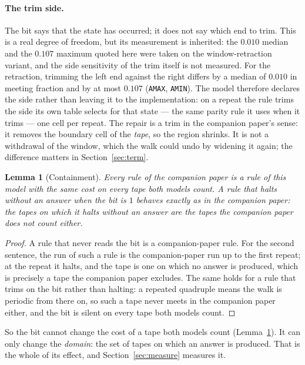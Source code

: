 \documentclass[11pt]{article}
\newtheorem{lemma}[theorem]{Lemma}
\theoremstyle{remark}
\begin{document}
\paragraph{The trim side.} The bit says that the state has occurred; it does not say which end to trim. This
is a real degree of freedom, but its measurement is inherited: the $0.010$ median and the $0.107$ maximum quoted here were taken on the window-retraction variant, and the side sensitivity of the trim itself is not measured. For the retraction, trimming the left end against the right differs by a median of $0.010$ in
meeting fraction and by at most $0.107$ (\texttt{AMAX}, \texttt{AMIN}). The model therefore declares the side rather
than leaving it to the implementation: on a repeat the rule trims the side its own table selects for that
state --- the same parity rule it uses when it trims --- one cell per repeat. The repair is a trim in the
companion paper's sense: it removes the boundary cell of the \emph{tape}, so the region shrinks. It is not a
withdrawal of the window, which the walk could undo by widening it again; the difference matters in
Section~\ref{sec:term}.

\begin{lemma}[Containment]\label{lem:contain}
Every rule of the companion paper is a rule of this model with the same cost on every tape both models
count. A rule that
halts without an answer when the bit is $1$ behaves exactly as in the companion paper: the tapes on which it
halts without an answer are the tapes the companion paper does not count either.
\end{lemma}
\begin{proof}
A rule that never reads the bit is a companion-paper rule. For the second sentence, the run of such a rule
is the companion-paper run up to the first repeat; at the repeat it halts, and the tape is one on which no
answer is produced, which is precisely a tape the companion paper excludes. The same holds for a rule that
trims on the bit rather than halting: a repeated quadruple means the walk is periodic from there on, so such
a tape never meets in the companion paper either, and the bit is silent on every tape both models count.
\end{proof}

So the bit cannot change the cost of a tape both models count (Lemma~\ref{lem:contain}). It can only change the \emph{domain}: the set
of tapes on which an answer is produced. That is the whole of its effect, and Section~\ref{sec:measure}
measures it.
\end{document}
